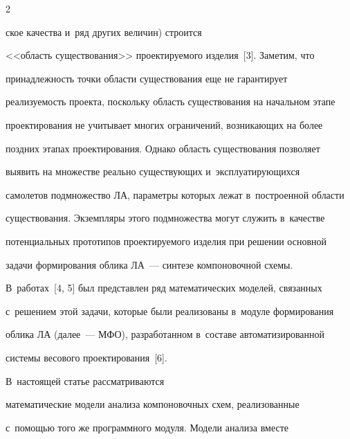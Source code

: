 \pagebreak








\begin{multicols}{2}








\noindent


 ское качества и~ряд других   величин) строится 


<<об\-ласть существования>> проектируемого изделия~[3]. Заметим, что 


при\-над\-леж\-ность точки об\-ласти существования еще не гарантирует 


ре\-а\-ли\-зу\-емость проекта, поскольку об\-ласть существования на начальном этапе 


проектирования не учитывает многих ограничений, воз\-ни\-ка\-ющих на более 


позд\-них этапах проектирования. Однако область существования позволяет 


выявить на множестве реально существующих и~экс\-плу\-а\-ти\-ру\-ющих\-ся 


самолетов подмножество ЛА, па\-ра\-мет\-ры которых лежат в~по\-стро\-ен\-ной об\-ласти 


существования. Экземпляры этого подмножества могут служить в~качестве 


потенциальных прототипов про\-ек\-ти\-ру\-емо\-го изделия при решении основной 


задачи формирования облика ЛА~--- синтезе компоновочной схемы. 





В~работах~[4, 5] был представлен ряд математических моделей, связанных 


с~решением этой задачи, которые были реализованы в~модуле формирования 


облика ЛА (далее~--- МФО), разработанном в~составе автоматизированной 


системы весового проектирования~[6]. 





В~на\-сто\-ящей статье рас\-смат\-ри\-ва\-ют\-ся 


математические модели анализа компоновочных схем, реализованные  


с~по\-мощью того же программного \mbox{модуля}. Модели анализа вместе 



\end{multicols}
